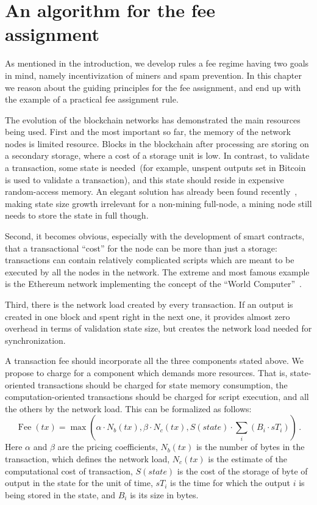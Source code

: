 \documentclass[]{llncs}   %
\begin{document}
\section{An algorithm for the fee assignment}
\label{sec:algorithm}

As mentioned in the introduction, we develop rules a fee regime having two goals
in mind, namely incentivization of miners and spam prevention.  In this chapter
we reason about the guiding  principles for the fee assignment, and end up with
the example of a practical fee assignment rule.

The evolution of the blockchain networks has demonstrated the main resources
being used. First and the most important so far, the memory of the network nodes 
is limited resource. Blocks in the blockchain after processing are storing on a 
secondary storage, where a cost of a storage unit is low. In contrast, to validate a 
transaction, some state is needed~(for example, unspent outputs set in Bitcoin is used 
to validate a transaction), and this state should reside in expensive random-access memory.   
An elegant solution has already been found recently~\cite{reyzin2016improving}, making state size growth irrelevant for 
a non-mining full-node, a mining node still needs to store the state in full though.

Second, it becomes obvious, especially with the development of smart contracts,
that a transactional ``cost'' for the node can be more than just a storage:
transactions can contain relatively complicated scripts which are meant to be
executed by all the nodes in the network. The extreme and most famous example is
the Ethereum network implementing the concept of the ``World Computer''~\cite{ethyp}. 

Third, there is the network load created by every transaction. If an output is
created in one block and spent right in the next one, it provides almost zero
overhead in terms of validation state size, but creates the network load needed
for synchronization.

A transaction fee should incorporate all the three components stated above. We
propose to charge for a component which demands more resources. That is,
state-oriented transactions should be charged for state memory consumption, the
computation-oriented transactions should be charged for script execution, and
all the others by the network load. This can be formalized as follows:
\begin{equation}
    \operatorname{Fee}(tx) = \max\left(\alpha \cdot N_b(tx), \beta \cdot N_c(tx),
    S(state) \cdot \sum_i (B_i \cdot sT_i) \right)\,.
    \label{eq:max}
\end{equation}
Here $\alpha$ and $\beta$ are the pricing coefficients, $N_b(tx)$ is the number
of bytes in the transaction, which defines the network load, $N_c(tx)$ is the
estimate of the computational cost of transaction, $S(state)$ is the cost of the
storage of byte of output in the state for the unit of time, $sT_i$ is the time
for which the output $i$ is being stored in the state, and $B_i$ is its size in
bytes.
\end{document}
